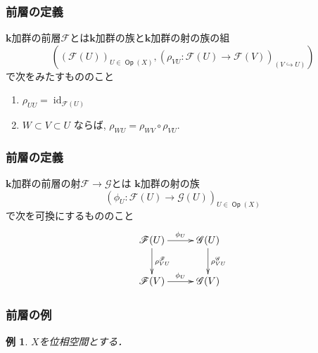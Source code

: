 \documentclass[dvipdfmx,12pt,aspectratio=169,leqno]{beamer}%
\newcommand{\kk}{\mathbf{k}}
\numberwithin{equation}{subsection}
\newcommand{\Op}{\mathop{\textsf{Op}}\nolimits}
\newcommand{\id}{\mathop{\mathrm{id}}\nolimits}
\theoremstyle{mystyle}
\newtheorem{EG}[AXM]{例}
\begin{document}
\begin{frame}
    \frametitle{前層の定義}

    \begin{definition}[前層]
        \(\kk\)加群の前層\(\mathscr{F}\)とは\(\kk\)加群の族と\(\kk\)加群の射の族の組\[\left(
        \left(\mathscr{F}(U)\right)_{U\in\Op(X)},
        \left(\rho_{VU}\colon\mathscr{F}(U)\to\mathscr{F}(V)\right)_{(V\hookrightarrow U)}
    \right)\]で次をみたすもののこと
    \begin{enumerate}
        \item $\rho_{UU} = \id_{\mathscr{F}(U)}$ 
        \item $W \subset V \subset U$ ならば, 
        $\rho_{WU} = \rho_{WV} \circ \rho_{VU}$.\label{enum:res}
    \end{enumerate}
    \end{definition}
\end{frame}
\begin{frame}
    \frametitle{前層の定義}

    \begin{definition}[前層の射]
        \(\kk\)加群の前層の射\(\mathscr{F}\to\mathscr{G}\)とは
        \(\kk\)加群の射の族\[
            (\phi_{U}\colon \mathscr{F}(U)
            \to \mathscr{G}(U))_{U\in\Op(X)}
        \]
        で次を可換にするもののこと
        \[\vcenter{\xymatrix@C=26pt@R=26pt{
            \mathscr{F}(U)
            \ar[r]^-{\phi_{U}}
            \ar[d]^-{\rho^{\mathscr{F}}_{VU}}
            &
            \mathscr{G}(U)
            \ar[d]^-{\rho^{\mathscr{G}}_{VU}} 
            \\
            \mathscr{F}(V)
            \ar[r]^-{\phi_{U}}
            &
            \mathscr{G}(V)
            }}
        \]
    \end{definition}
\end{frame}
\begin{frame}
    \frametitle{前層の例}
\begin{EG}
    \(X\)を位相空間とする．
\end{EG}
\end{frame}
\end{document}
